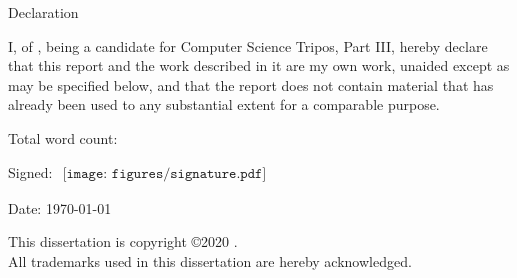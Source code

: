 \newpage
{\Huge Declaration}

\vspace{24pt} 

I, \authorname of \authorcollege, being a candidate for Computer Science Tripos, Part III, hereby declare that this report and the work described in it are my own work, unaided except as may be specified below, and that the report does not contain material that has already been used to any substantial extent for a comparable purpose.

\vspace{24pt}
Total word count: 

\vspace{60pt}
{\large Signed}: $
\begin{array}{l}
\texttt{[image: figures/signature.pdf]}
\end{array}
$

\vspace{12pt}
{\large Date}: \today


\vfill

This dissertation is copyright \copyright 2020 \authorname. 
\\
All trademarks used in this dissertation are hereby acknowledged.



\newpage
\vspace*{\fill}
